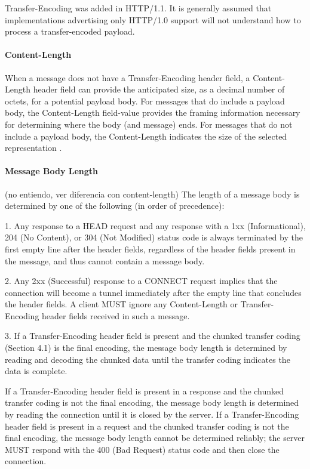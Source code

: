 Transfer-Encoding was added in HTTP/1.1.  It is generally assumed
that implementations advertising only HTTP/1.0 support will not
understand how to process a transfer-encoded payload. 

\paragraph{Content-Length }
When a message does not have a Transfer-Encoding header field, a
   Content-Length header field can provide the anticipated size, as a
   decimal number of octets, for a potential payload body.  For messages
   that do include a payload body, the Content-Length field-value
   provides the framing information necessary for determining where the
   body (and message) ends.  For messages that do not include a payload
   body, the Content-Length indicates the size of the selected
   representation .

    

\paragraph{Message Body Length }

(no entiendo, ver diferencia con content-length)
The length of a message body is determined by one of the following
(in order of precedence):

1.  Any response to a HEAD request and any response with a 1xx
    (Informational), 204 (No Content), or 304 (Not Modified) status
    code is always terminated by the first empty line after the
    header fields, regardless of the header fields present in the
    message, and thus cannot contain a message body.

2.  Any 2xx (Successful) response to a CONNECT request implies that
    the connection will become a tunnel immediately after the empty
    line that concludes the header fields.  A client MUST ignore any
    Content-Length or Transfer-Encoding header fields received in
    such a message.

3.  If a Transfer-Encoding header field is present and the chunked
    transfer coding (Section 4.1) is the final encoding, the message
    body length is determined by reading and decoding the chunked
    data until the transfer coding indicates the data is complete.

    If a Transfer-Encoding header field is present in a response and
    the chunked transfer coding is not the final encoding, the
    message body length is determined by reading the connection until
    it is closed by the server.  If a Transfer-Encoding header field
    is present in a request and the chunked transfer coding is not
    the final encoding, the message body length cannot be determined
    reliably; the server MUST respond with the 400 (Bad Request)
    status code and then close the connection.

